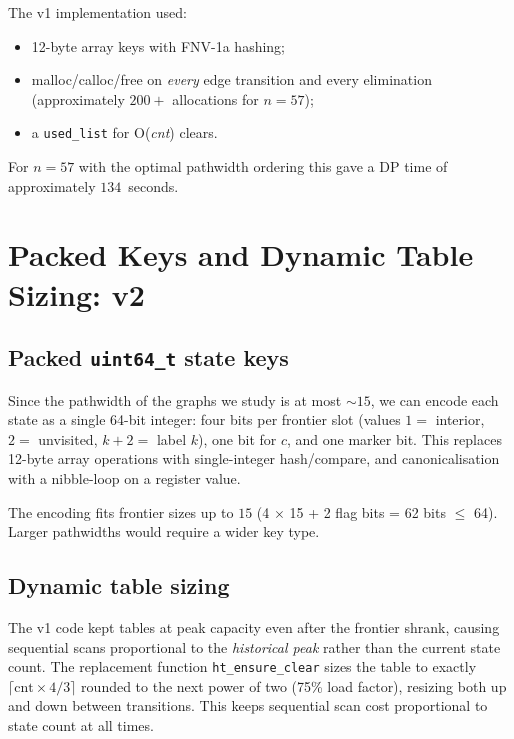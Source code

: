 \documentclass[12pt]{article}
\theoremstyle{definition}
\begin{document}
The v1 implementation used:
\begin{itemize}[nosep]
  \item 12-byte array keys with FNV-1a hashing;
  \item malloc/calloc/free on \emph{every} edge transition and every elimination
        (approximately $200{+}$ allocations for $n = 57$);
  \item a \texttt{used\_list} for O(\textit{cnt}) clears.
\end{itemize}

For $n = 57$ with the optimal pathwidth ordering this gave a DP time of
approximately $134$~seconds.

\section{Packed Keys and Dynamic Table Sizing: v2}
\label{sec:v2}

\subsection{Packed \texttt{uint64\_t} state keys}

Since the pathwidth of the graphs we study is at most $\sim\!15$, we can
encode each state as a single 64-bit integer: four bits per frontier slot
(values $1 = $ interior, $2 = $ unvisited, $k+2 = $ label $k$), one bit for
$c$, and one marker bit.
This replaces 12-byte array operations with single-integer hash/compare, and
canonicalisation with a nibble-loop on a register value.

The encoding fits frontier sizes up to $15$ (4 $\times$ 15 + 2 flag bits = 62
bits $\le$ 64).
Larger pathwidths would require a wider key type.

\subsection{Dynamic table sizing}

The v1 code kept tables at peak capacity even after the frontier shrank,
causing sequential scans proportional to the \emph{historical peak} rather
than the current state count.
The replacement function \texttt{ht\_ensure\_clear} sizes the table to
exactly $\lceil \text{cnt} \times 4/3 \rceil$ rounded to the next power
of two (75\% load factor), resizing both up and down between transitions.
This keeps sequential scan cost proportional to state count at all times.
\end{document}
